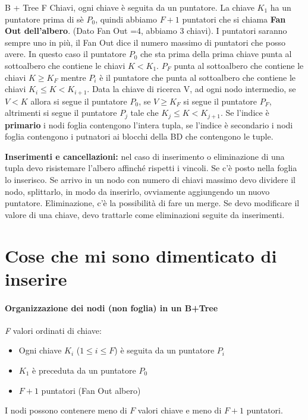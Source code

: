 \documentclass{article}
\begin{document}
			
			B + Tree
			F Chiavi, ogni chiave è seguita da un puntatore. La chiave $K_1$ ha un puntatore prima di sè $P_0$, quindi abbiamo $F+1$ puntatori che si chiama \textbf{Fan Out dell'albero}. (Dato Fan Out =4, abbiamo 3 chiavi). I puntatori saranno sempre uno in più, il Fan Out dice il numero massimo di puntatori che posso avere. In questo caso il puntatore $P_0$ che sta prima della prima chiave punta al sottoalbero che contiene le chiavi $K<K_1$. $P_F$ punta al sottoalbero che contiene le chiavi $K \geq K_F$ mentre $P_i$ è il puntatore che punta al sottoalbero che contiene le chiavi $K_i \leq K < K_{i+1}$.
			Data la chiave di ricerca V, ad ogni nodo intermedio, se $V<K$ allora si segue il puntatore $P_0$, se $V\geq K_F$ si segue il puntatore $P_F$, altrimenti si segue il puntatore $P_j$ tale che $K_j \leq K < K_{j+1}$. Se l'indice è \textbf{primario} i nodi foglia contengono l'intera tupla, se l'indice è secondario i nodi foglia contengono i putnatori ai blocchi della BD che contengono le tuple. 
			
			\textbf{Inserimenti e cancellazioni:} nel caso di inserimento o eliminazione di una tupla devo risistemare l'albero affinché rispetti i vincoli. Se c'è posto nella foglia lo inserisco. Se arrivo in un nodo con numero di chiavi massimo devo dividere il nodo, splittarlo, in modo da inserirlo, ovviamente aggiungendo un nuovo puntatore. Eliminazione, c'è la possibilità di fare un merge. Se devo modificare il valore di una chiave, devo trattarle come eliminazioni seguite da inserimenti. 
			
			\newpage
			\section{Cose che mi sono dimenticato di inserire}
	\paragraph{Organizzazione dei nodi (non foglia) in un B+Tree}
	\textit{F} valori ordinati di chiave:
	\begin{itemize}
		\item Ogni chiave $K_i$ ($1\leq i \leq F$) è seguita da un puntatore $P_i$
		\item $K_1$ è preceduta da un puntatore $P_0$
		\item $F+1$ puntatori (Fan Out albero)
	\end{itemize}
	I nodi possono contenere meno di $F$ valori chiave e meno di $F+1$ puntatori.
	
\end{document}
